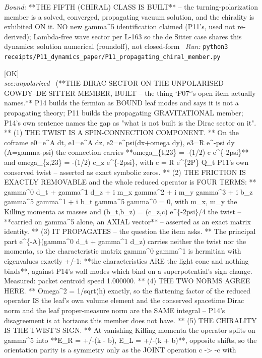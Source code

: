 \begin{description}
 \emph{Bound:} **THE FIFTH (CHIRAL) CLASS IS BUILT** -- the turning-polarization member is a solved, converged, propagating vacuum solution, and the chirality is exhibited ON it. NO new gamma\textasciicircum{}5 identification claimed (P11's, used not re-derived); Lambda-free wave sector per L-163 so the de Sitter case shares this dynamics; solution numerical (roundoff), not closed-form
\ \emph{Run:} \texttt{python3 receipts/P11\_dynamics\_paper/P11\_propagating\_chiral\_member.py}
\item[\label{rcpt:C50_the_dirac_sector_propagates_and_its_chirality_is_the_twists_sign}\texttt{C50\_the\_dirac\_sector\_propagates\_and\_its\_chirality\_is\_the\_twists\_sign}]\hfill\textsf{[OK]}\\
\textit{sec:unpolarized} \ (**THE DIRAC SECTOR ON THE UNPOLARISED GOWDY--DE SITTER MEMBER, BUILT -- the thing `P07`'s open item actually names.** P14 builds the fermion as BOUND leaf modes and says it is not a propagating theory; P11 builds the propagating GRAVITATIONAL member; P14's own sentence names the gap as "what is not built is the Dirac sector on it". ** (1) THE TWIST IS A SPIN-CONNECTION COMPONENT. ** On the coframe e0=e\textasciicircum{}A dt, e1=e\textasciicircum{}A dz, e2=e\textasciicircum{}psi(dx+omega dy), e3=R e\textasciicircum{}-psi dy (A=gamma-psi) the connection carries **omega\_\{t,23\} = -(1/2) c e\textasciicircum{}\{-2psi\}** and omega\_\{z,23\} = -(1/2) c\_z e\textasciicircum{}\{-2psi\}, with c = R e\textasciicircum{}\{2P\} Q\_t P11's own conserved twist -- asserted as exact symbolic zeros. ** (2) THE FRICTION IS EXACTLY REMOVABLE and the whole reduced operator is FOUR TERMS: ** gamma\textasciicircum{}0 d\_t + gamma\textasciicircum{}1 d\_z + i m\_x gamma\textasciicircum{}2 + i m\_y gamma\textasciicircum{}3 + i b\_z gamma\textasciicircum{}5 gamma\textasciicircum{}1 + i b\_t gamma\textasciicircum{}5 gamma\textasciicircum{}0 = 0, with m\_x, m\_y the Killing momenta as masses and (b\_t,b\_z) = (c\_z,c) e\textasciicircum{}\{-2psi\}/4 the twist -- **carried on gamma\textasciicircum{}5 alone, an AXIAL vector** -- asserted as an exact matrix identity. ** (3) IT PROPAGATES -- the question the item asks. ** The principal part e\textasciicircum{}\{-A\}(gamma\textasciicircum{}0 d\_t + gamma\textasciicircum{}1 d\_z) carries neither the twist nor the momenta, so the characteristic matrix gamma\textasciicircum{}0 gamma\textasciicircum{}1 is hermitian with eigenvalues exactly +/-1: **the characteristics ARE the light cone and nothing binds**, against P14's wall modes which bind on a superpotential's sign change. Measured: packet centroid speed 1.000000. ** (4) THE TWO NORMS AGREE HERE. ** Omega\textasciicircum{}2 = 1/sqrt(h) exactly, so the flattening factor of the reduced operator IS the leaf's own volume element and the conserved spacetime Dirac norm and the leaf proper-measure norm are the SAME integral -- P14's disagreement is at horizons this member does not have. ** (5) THE CHIRALITY IS THE TWIST'S SIGN. ** At vanishing Killing momenta the operator splits on gamma\textasciicircum{}5 into **E\_R = +/-(k - b), E\_L = +/-(k + b)**, opposite shifts, so the orientation parity is a symmetry only as the JOINT operation c -> -c with 
\end{description}
